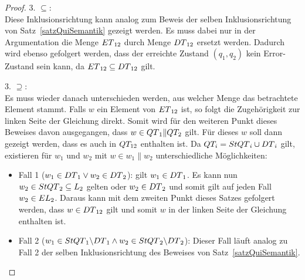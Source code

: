 \begin{proof}
  3. \glqq{}$\subseteq$\grqq{}:\\
  Diese Inklusionsrichtung kann analog zum Beweis der selben Inklusionsrichtung
  von Satz~\ref{satzQuiSemantik} gezeigt werden. Es muss dabei nur in der
  Argumentation die Menge $ET{}_{12}$ durch Menge $DT{}_{12}$ ersetzt werden.
  Dadurch wird ebenso gefolgert werden, dass der erreichte Zustand $(q_1,q_2)$
  kein Error-Zustand sein kann, da $ET{}_{12}\subseteq DT{}_{12}$ gilt.

  3. \glqq{}$\supseteq$\grqq{}:\\
  Es muss wieder danach unterschieden werden, aus welcher Menge das betrachtete
  Element stammt. Falls $w$ ein Element von $ET{}_{12}$ ist, so folgt die
  Zugehörigkeit zur linken Seite der Gleichung direkt. Somit wird für den
  weiteren Punkt dieses Beweises davon ausgegangen, dass $w\in QT{}_1\|QT_2$
  gilt. Für dieses $w$ soll dann gezeigt werden, dass es auch in $QT_{12}$
  enthalten ist. Da $QT_i=StQT{}_i\cup DT{}_i$ gilt, existieren für $w_1$
  und $w_2$ mit $w\in w_1\|w_2$ unterschiedliche Möglichkeiten:
  \begin{itemize}
    \item Fall 1 ($w_1\in DT{}_1 \vee w_2\in DT{}_2$): \OBdA{} gilt $w_1\in
      DT{}_1$. Es kann nun $w_2\in StQT{}_2 \subseteq L_2$ gelten oder
      $w_2\in DT{}_2$ und somit gilt auf jeden Fall $w_2\in EL{}_2$. Daraus
      kann mit dem zweiten Punkt dieses Satzes gefolgert werden, dass $w\in
      DT{}_{12}$ gilt und somit $w$ in der linken Seite der Gleichung
      enthalten ist.
    \item Fall 2 ($w_1\in StQT{}_1\backslash DT{}_1 \wedge w_2\in StQT{}_2
      \backslash DT{}_2$): Dieser Fall läuft analog zu Fall 2 der selben
      Inklusionsrichtung des Beweises von Satz~\ref{satzQuiSemantik}.
  \end{itemize}
\end{proof}
